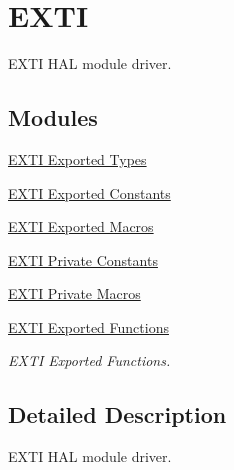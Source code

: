 \hypertarget{group___e_x_t_i}{}\section{E\+X\+TI}
\label{group___e_x_t_i}


E\+X\+TI H\+AL module driver.  


\subsection*{Modules}
\begin{DoxyCompactItemize}
\item 
\hyperlink{group___e_x_t_i___exported___types}{E\+X\+T\+I Exported Types}
\item 
\hyperlink{group___e_x_t_i___exported___constants}{E\+X\+T\+I Exported Constants}
\item 
\hyperlink{group___e_x_t_i___exported___macros}{E\+X\+T\+I Exported Macros}
\item 
\hyperlink{group___e_x_t_i___private___constants}{E\+X\+T\+I Private Constants}
\item 
\hyperlink{group___e_x_t_i___private___macros}{E\+X\+T\+I Private Macros}
\item 
\hyperlink{group___e_x_t_i___exported___functions}{E\+X\+T\+I Exported Functions}
\begin{DoxyCompactList}\small\item\em E\+X\+TI Exported Functions. \end{DoxyCompactList}\end{DoxyCompactItemize}


\subsection{Detailed Description}
E\+X\+TI H\+AL module driver. 

